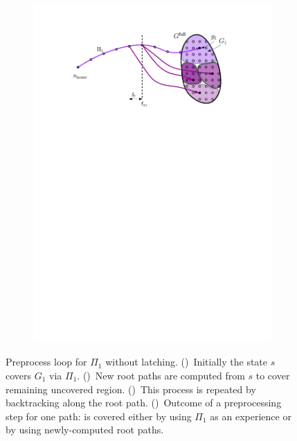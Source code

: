 \documentclass[conference]{IEEEtran}
\begin{document}
\begin{figure}[t]
\begin{subfigure}{.225\textwidth}
        \includegraphics[width=\textwidth]{pre4}
        \caption{}
        \label{fig:pre4}
    \end{subfigure}
    \caption{\CaptionTextSize
    Preprocess loop for $\Pi_1$ without latching.
    ()~Initially the state $s$ covers $G_1$ via $\Pi_1$. 
    ()~New root paths are computed from $s$ to cover remaining uncovered region.
    ()~This process is repeated by backtracking along the root path.
    ()~Outcome of a preprocessing step for one path: \Gfull is covered either by using $\Pi_1$ as an experience or by 
    using newly-computed root paths. 
    }
    \label{fig:pl}
\end{figure}
\end{document}
